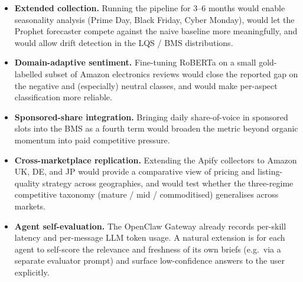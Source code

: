\begin{itemize}
  \item \textbf{Extended collection.} Running the pipeline for 3--6
  months would enable seasonality analysis (Prime Day, Black Friday,
  Cyber Monday), would let the Prophet forecaster compete against the
  naive baseline more meaningfully, and would allow drift detection in
  the LQS / BMS distributions.

  \item \textbf{Domain-adaptive sentiment.} Fine-tuning RoBERTa on a
  small gold-labelled subset of Amazon electronics reviews would close the
  reported gap on the negative and (especially) neutral classes, and
  would make per-aspect classification more reliable.

  \item \textbf{Sponsored-share integration.} Bringing daily share-of-voice
  in sponsored slots into the BMS as a fourth term would broaden the
  metric beyond organic momentum into paid competitive pressure.

  \item \textbf{Cross-marketplace replication.} Extending the Apify
  collectors to Amazon UK, DE, and JP would provide a comparative view
  of pricing and listing-quality strategy across geographies, and would
  test whether the three-regime competitive taxonomy (mature / mid /
  commoditised) generalises across markets.

  \item \textbf{Agent self-evaluation.} The OpenClaw Gateway already
  records per-skill latency and per-message LLM token usage. A
  natural extension is for each agent to self-score the relevance and
  freshness of its own briefs (e.g.\ via a separate evaluator prompt) and
  surface low-confidence answers to the user explicitly.
\end{itemize}
